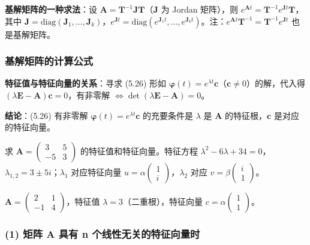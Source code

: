 \textbf{基解矩阵的一种求法}：设 $\mathbf{A} = \mathbf{T}^{-1}\mathbf{J}\mathbf{T}$（$\mathbf{J}$ 为 Jordan 矩阵），则 $e^{\mathbf{A}t} = \mathbf{T}^{-1}e^{\mathbf{J}t}\mathbf{T}$，其中 $\mathbf{J} = \mathrm{diag}(\mathbf{J}_1, \ldots, \mathbf{J}_k)$，$e^{\mathbf{J}t} = \mathrm{diag}(e^{\mathbf{J}_1t}, \ldots, e^{\mathbf{J}_kt})$。注：$e^{\mathbf{A}t}\mathbf{T}^{-1} = \mathbf{T}^{-1}e^{\mathbf{J}t}$ 也是基解矩阵。

\subsubsection{基解矩阵的计算公式}

\textbf{特征值与特征向量的关系}：寻求 (5.26) 形如 $\boldsymbol{\varphi}(t) = e^{\lambda t}\mathbf{c}$（$\mathbf{c} \neq 0$）的解，代入得 $(\lambda\mathbf{E} - \mathbf{A})\mathbf{c} = 0$，有非零解 $\iff \det(\lambda\mathbf{E} - \mathbf{A}) = 0$。

\textbf{结论}：(5.26) 有非零解 $\boldsymbol{\varphi}(t) = e^{\lambda t}\mathbf{c}$ 的充要条件是 $\lambda$ 是 $\mathbf{A}$ 的特征根，$\mathbf{c}$ 是对应的特征向量。

\begin{example}
求 $\mathbf{A} = \begin{pmatrix} 3 & 5 \\ -5 & 3 \end{pmatrix}$ 的特征值和特征向量。特征方程 $\lambda^2 - 6\lambda + 34 = 0$，$\lambda_{1,2} = 3 \pm 5i$；$\lambda_1$ 对应特征向量 $u = \alpha\begin{pmatrix}1\\i\end{pmatrix}$，$\lambda_2$ 对应 $v = \beta\begin{pmatrix}i\\1\end{pmatrix}$。
\end{example}

\begin{example}
$\mathbf{A} = \begin{pmatrix} 2 & 1 \\ -1 & 4 \end{pmatrix}$，特征值 $\lambda = 3$（二重根），特征向量 $c = \alpha\begin{pmatrix}1\\1\end{pmatrix}$。
\end{example}

\subsubsection{(1) 矩阵 A 具有 n 个线性无关的特征向量时}

